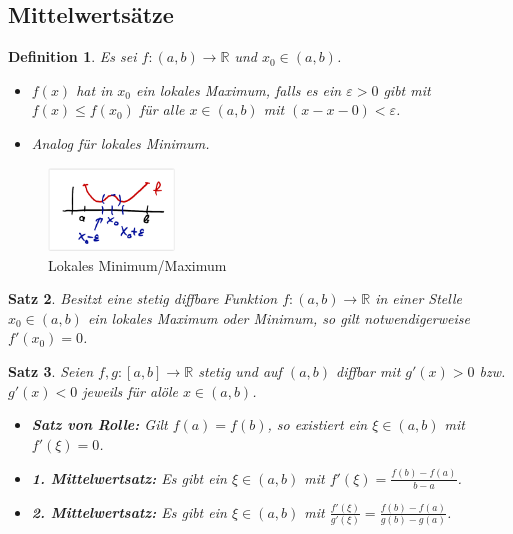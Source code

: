 \documentclass[12pt,a4paper]{report}%
\newtheorem{satz}{Satz}[section]
\newtheorem{definition}[satz]{Definition}
\numberwithin{equation}{section}
\newcommand{\R}{\mathbb{R}} %
\numberwithin{equation}{subsection}
\begin{document}
  \subsection{Mittelwertsätze}  
  \begin{definition}
    Es sei $f:(a,b)\rightarrow \R$ und $x_0 \in (a,b)$.
    \begin{itemize}
      \item[a) ]$f(x)$ hat in $x_0$ ein lokales Maximum, falls es ein $\varepsilon > 0$ gibt mit $f(x) \leq f(x_0)$ für alle $x \in (a,b)$ mit $(x-x-0) < \varepsilon$.
      \item[b) ] Analog für lokales Minimum. 
    \end{itemize}
  \end{definition}
  \vspace{-0.5cm}
	  \begin{figure}[H]
	  \centering
	  \includegraphics[width=0.3\textwidth]{mws_def.png}
	  \caption{Lokales Minimum/Maximum\protect\cite{HM12}}
	  \label{fig:mws_min_max}
	\end{figure}
  \begin{satz}
    Besitzt eine stetig diffbare Funktion $f: (a,b) \rightarrow \R$ in einer Stelle $x_0 \in (a,b)$ ein lokales Maximum oder Minimum, so gilt notwendigerweise $f'(x_0) = 0$.
  \end{satz}
  \begin{satz}
    Seien $f,g:[a,b] \rightarrow \R$ stetig und auf $(a,b)$ diffbar mit $g'(x) > 0$ bzw. $g'(x) <0$ jeweils für alöle $x \in (a,b)$. 
    \begin{itemize}
      \item[a) ] \textbf{Satz von Rolle:} Gilt $f(a) = f(b)$, so existiert ein $\xi \in (a,b)$ mit $f'(\xi) = 0$.
      \item[b) ] \textbf{1. Mittelwertsatz:} Es gibt ein $\xi \in (a,b)$ mit $f'(\xi) = \frac{f(b) - f(a)}{b-a}$.
      \item[c) ] \textbf{2. Mittelwertsatz:} Es gibt ein $\xi \in (a,b)$ mit $\frac{f'(\xi)}{g'(\xi)} = \frac{f(b) - f(a)}{g(b) - g(a)}$.
    \end{itemize}
  \end{satz}
\end{document}
